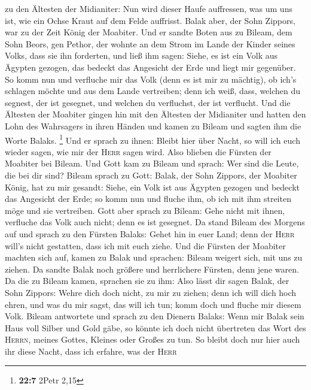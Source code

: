 zu den Ältesten der Midianiter: Nun wird dieser Haufe auffressen, was um
uns ist, wie ein Ochse Kraut auf dem Felde auffrisst. Balak aber, der
Sohn Zippors, war zu der Zeit König der Moabiter.  Und er
sandte Boten aus zu Bileam, dem Sohn Beors, gen Pethor, der wohnte an
dem Strom im Lande der Kinder seines Volks, dass sie ihn forderten, und
ließ ihm sagen: Siehe, es ist ein Volk aus Ägypten gezogen, das bedeckt
das Angesicht der Erde und liegt mir gegenüber.  So komm
nun und verfluche mir das Volk (denn es ist mir zu mächtig), ob ich's
schlagen möchte und aus dem Lande vertreiben; denn ich weiß, dass,
welchen du segnest, der ist gesegnet, und welchen du verfluchst, der ist
verflucht.  Und die Ältesten der Moabiter gingen hin mit
den Ältesten der Midianiter und hatten den Lohn des Wahrsagers in ihren
Händen und kamen zu Bileam und sagten ihm die Worte Balaks. \footnote{\textbf{22:7}
  2Petr 2,15}  Und er sprach zu ihnen: Bleibt hier über
Nacht, so will ich euch wieder sagen, wie mir der \textsc{Herr} sagen
wird. Also blieben die Fürsten der Moabiter bei Bileam. 
Und Gott kam zu Bileam und sprach: Wer sind die Leute, die bei dir sind?
 Bileam sprach zu Gott: Balak, der Sohn Zippors, der
Moabiter König, hat zu mir gesandt:  Siehe, ein Volk ist
aus Ägypten gezogen und bedeckt das Angesicht der Erde; so komm nun und
fluche ihm, ob ich mit ihm streiten möge und sie vertreiben.
 Gott aber sprach zu Bileam: Gehe nicht mit ihnen,
verfluche das Volk auch nicht; denn es ist gesegnet.  Da
stand Bileam des Morgens auf und sprach zu den Fürsten Balaks: Gehet hin
in euer Land; denn der \textsc{Herr} will's nicht gestatten, dass ich
mit euch ziehe.  Und die Fürsten der Moabiter machten
sich auf, kamen zu Balak und sprachen: Bileam weigert sich, mit uns zu
ziehen.  Da sandte Balak noch größere und herrlichere
Fürsten, denn jene waren.  Da die zu Bileam kamen,
sprachen sie zu ihm: Also lässt dir sagen Balak, der Sohn Zippors: Wehre
dich doch nicht, zu mir zu ziehen;  denn ich will dich
hoch ehren, und was du mir sagst, das will ich tun; komm doch und fluche
mir diesem Volk.  Bileam antwortete und sprach zu den
Dienern Balaks: Wenn mir Balak sein Haus voll Silber und Gold gäbe, so
könnte ich doch nicht übertreten das Wort des \textsc{Herrn}, meines
Gottes, Kleines oder Großes zu tun.  So bleibt doch nur
hier auch ihr diese Nacht, dass ich erfahre, was der \textsc{Herr}
